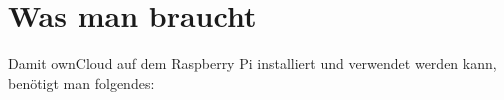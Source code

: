 \section{Was man braucht}
Damit ownCloud auf dem Raspberry Pi installiert und verwendet werden kann, benötigt man folgendes:


